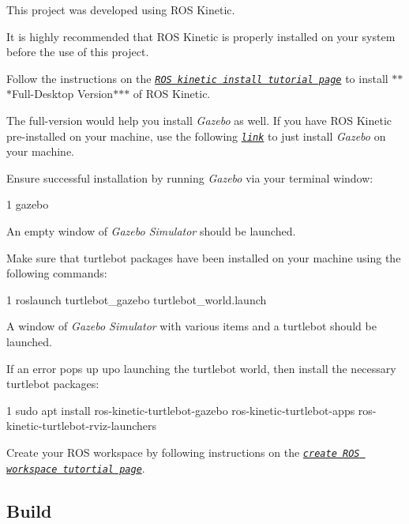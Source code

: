 \begin{DoxyItemize}
\item This project was developed using R\+OS Kinetic.
\item It is highly recommended that R\+OS Kinetic is properly installed on your system before the use of this project.
\item Follow the instructions on the \href{http://wiki.ros.org/kinetic/Installation/Ubuntu}{\tt {\itshape R\+OS kinetic install tutorial page}} to install $\ast$$\ast$$\ast$\+Full-\/\+Desktop Version$\ast$$\ast$$\ast$ of R\+OS Kinetic.
\item The full-\/version would help you install {\itshape Gazebo} as well. If you have R\+OS Kinetic pre-\/installed on your machine, use the following \href{http://gazebosim.org/tutorials?tut=install_ubuntu&cat=install}{\tt {\itshape link}} to just install {\itshape Gazebo} on your machine.
\item Ensure successful installation by running {\itshape Gazebo} via your terminal window\+: 
\begin{DoxyCode}
1 gazebo
\end{DoxyCode}

\item An empty window of {\itshape Gazebo Simulator} should be launched.
\item Make sure that turtlebot packages have been installed on your machine using the following commands\+: 
\begin{DoxyCode}
1 roslaunch turtlebot\_gazebo turtlebot\_world.launch
\end{DoxyCode}

\item A window of {\itshape Gazebo Simulator} with various items and a turtlebot should be launched.
\item If an error pops up upo launching the turtlebot world, then install the necessary turtlebot packages\+: 
\begin{DoxyCode}
1 sudo apt install ros-kinetic-turtlebot-gazebo ros-kinetic-turtlebot-apps
       ros-kinetic-turtlebot-rviz-launchers
\end{DoxyCode}

\item Create your R\+OS workspace by following instructions on the \href{http://wiki.ros.org/catkin/Tutorials/create_a_workspace}{\tt {\itshape create R\+OS workspace tutortial page}}.
\end{DoxyItemize}

\subsection*{Build}


